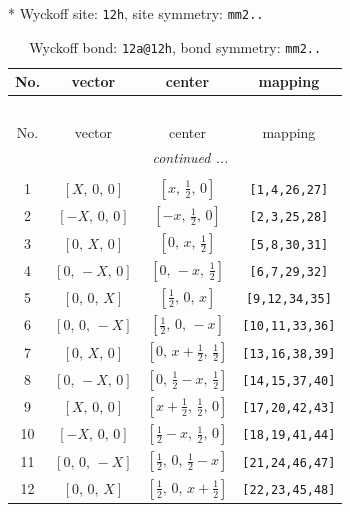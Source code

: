 \documentclass[fleqn,8pt]{jsarticle}
\begin{document}
* Wyckoff site: {\tt 12h}, site symmetry: {\tt mm2..}
\renewcommand{\arraystretch}{1.2}
\begin{longtable}{cccc}
\caption{Wyckoff bond: {\tt 12a@12h}, bond symmetry: {\tt mm2..}}
 \\
 \hline \hline
No. & vector & center & mapping \\ \hline \endfirsthead

\multicolumn{3}{l}{\tablename\ \thetable{}} \\
 \hline \hline
No. & vector & center & mapping \\ \hline \endhead

 \hline \hline
\multicolumn{3}{r}{\footnotesize\it continued ...} \\ \endfoot

 \hline \hline
\multicolumn{3}{r}{} \\ \endlastfoot

1 & $\left[ X,\, 0,\, 0 \right]$ & $\left[ x,\, \frac{1}{2},\, 0 \right]$ & {\tt [1,4,26,27]} \\ \hline
2 & $\left[ - X,\, 0,\, 0 \right]$ & $\left[ - x,\, \frac{1}{2},\, 0 \right]$ & {\tt [2,3,25,28]} \\ \hline
3 & $\left[ 0,\, X,\, 0 \right]$ & $\left[ 0,\, x,\, \frac{1}{2} \right]$ & {\tt [5,8,30,31]} \\ \hline
4 & $\left[ 0,\, - X,\, 0 \right]$ & $\left[ 0,\, - x,\, \frac{1}{2} \right]$ & {\tt [6,7,29,32]} \\ \hline
5 & $\left[ 0,\, 0,\, X \right]$ & $\left[ \frac{1}{2},\, 0,\, x \right]$ & {\tt [9,12,34,35]} \\ \hline
6 & $\left[ 0,\, 0,\, - X \right]$ & $\left[ \frac{1}{2},\, 0,\, - x \right]$ & {\tt [10,11,33,36]} \\ \hline
7 & $\left[ 0,\, X,\, 0 \right]$ & $\left[ 0,\, x + \frac{1}{2},\, \frac{1}{2} \right]$ & {\tt [13,16,38,39]} \\ \hline
8 & $\left[ 0,\, - X,\, 0 \right]$ & $\left[ 0,\, \frac{1}{2} - x,\, \frac{1}{2} \right]$ & {\tt [14,15,37,40]} \\ \hline
9 & $\left[ X,\, 0,\, 0 \right]$ & $\left[ x + \frac{1}{2},\, \frac{1}{2},\, 0 \right]$ & {\tt [17,20,42,43]} \\ \hline
10 & $\left[ - X,\, 0,\, 0 \right]$ & $\left[ \frac{1}{2} - x,\, \frac{1}{2},\, 0 \right]$ & {\tt [18,19,41,44]} \\ \hline
11 & $\left[ 0,\, 0,\, - X \right]$ & $\left[ \frac{1}{2},\, 0,\, \frac{1}{2} - x \right]$ & {\tt [21,24,46,47]} \\ \hline
12 & $\left[ 0,\, 0,\, X \right]$ & $\left[ \frac{1}{2},\, 0,\, x + \frac{1}{2} \right]$ & {\tt [22,23,45,48]} \\
\end{longtable}
\end{document}
